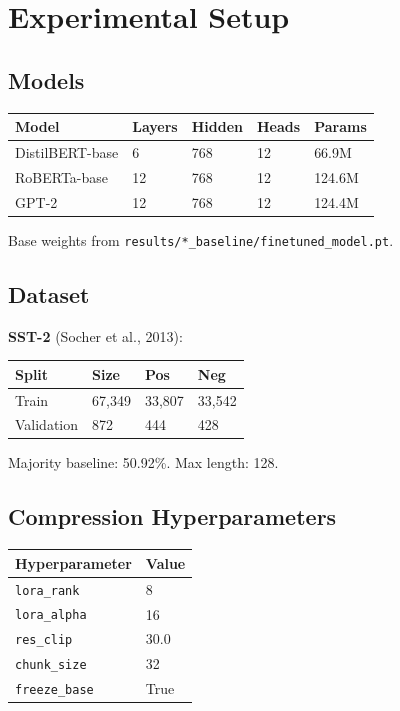 \section{Experimental Setup}

\subsection{Models}

\begin{table}[H]
\centering
\small
\begin{tabular}{lllll}
\toprule
\textbf{Model} & \textbf{Layers} & \textbf{Hidden} & \textbf{Heads} & \textbf{Params} \\
\midrule
DistilBERT-base & 6 & 768 & 12 & 66.9M \\
RoBERTa-base & 12 & 768 & 12 & 124.6M \\
GPT-2 & 12 & 768 & 12 & 124.4M \\
\bottomrule
\end{tabular}
\end{table}

Base weights from \texttt{results/*\_baseline/finetuned\_model.pt}.

\subsection{Dataset}

\textbf{SST-2} (Socher et al., 2013):

\begin{table}[H]
\centering
\small
\begin{tabular}{llll}
\toprule
\textbf{Split} & \textbf{Size} & \textbf{Pos} & \textbf{Neg} \\
\midrule
Train & 67,349 & 33,807 & 33,542 \\
Validation & 872 & 444 & 428 \\
\bottomrule
\end{tabular}
\end{table}

Majority baseline: 50.92\%. Max length: 128.

\subsection{Compression Hyperparameters}

\begin{table}[H]
\centering
\small
\begin{tabular}{ll}
\toprule
\textbf{Hyperparameter} & \textbf{Value} \\
\midrule
\texttt{lora\_rank} & 8 \\
\texttt{lora\_alpha} & 16 \\
\texttt{res\_clip} & 30.0 \\
\texttt{chunk\_size} & 32 \\
\texttt{freeze\_base} & True \\
\bottomrule
\end{tabular}
\end{table}

